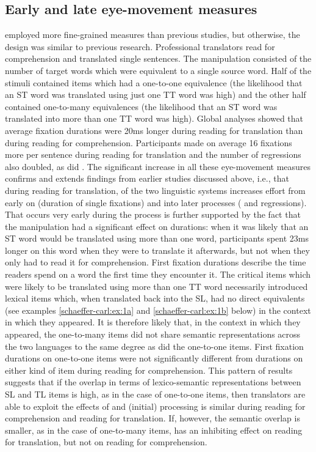\documentclass[output=paper]{LSP/langsci}
\begin{document}
\subsection{Early and late eye-movement measures}

\citet{SchaefferForthcoming} employed more fine-grained  measures than previous studies, but otherwise, the design was similar to previous research. Professional translators read for comprehension and translated single sentences. The manipulation consisted of the number of target words which were equivalent to a single source word. Half of the stimuli contained items which had a one-to-one equivalence (the likelihood that an ST word was translated using just one TT word was high) and the other half contained one-to-many equivalences (the likelihood that an ST word was translated into more than one TT word was high). Global analyses showed that average fixation durations were 20ms longer during reading for translation than during reading for comprehension. Participants made on average 16 fixations more per sentence during reading for translation and the number of regressions also doubled, as did . The significant increase in all these eye-movement measures confirms and extends findings from earlier studies discussed above, i.e., that during reading for translation,  of the two linguistic systems increases effort from early on (duration of single fixations) and into later processes ( and regressions). That  occurs very early during the process is further supported by the fact that the manipulation had a significant effect on  durations: when it was likely that an ST word would be translated using more than one word, participants spent 23ms longer on this word when they were to translate it afterwards, but not when they only had to read it for comprehension. First fixation durations describe the time readers spend on a word the first time they encounter it. The critical items which were likely to be translated using more than one TT word necessarily introduced lexical items which, when translated back into the SL, had no direct equivalents (see examples \ref{schaeffer-carl:ex:1a} and \ref{schaeffer-carl:ex:1b} below) in the context in which they appeared. It is therefore likely that, in the context in which they appeared, the one-to-many items did not share semantic representations across the two languages to the same degree as did the one-to-one items. First fixation durations on one-to-one items were not significantly different from  durations on either kind of item during reading for comprehension. This pattern of results suggests that if the overlap in terms of lexico-semantic representations between SL and TL items is high, as in the case of one-to-one items, then translators are able to exploit the effects of  and (initial) processing is similar during reading for comprehension and reading for translation. If, however, the semantic overlap is smaller, as in the case of one-to-many items,  has an inhibiting effect on reading for translation, but not on reading for comprehension.
\end{document}
